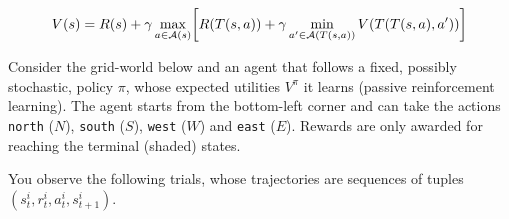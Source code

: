 \documentclass[11pt, a4paper]{exam}
\begin{document}
\begin{exercises}
\begin{parts}
    \begin{solution}
        \begin{equation*}
            V(s) = R(s) + \gamma \max_{a \in \mathcal{A}(s)} \sbk*{ R(T(s, a)) + \gamma \min_{a' \in \mathcal{A}(T(s, a))} V(T(T(s, a), a')) }
        \end{equation*}
    \end{solution}
\end{parts}


Consider the grid-world below and an agent that follows a fixed, possibly stochastic, policy $\pi$, whose expected utilities $V^\pi$ it learns (passive reinforcement learning). The agent starts from the bottom-left corner and can take the actions \texttt{north} ($N$), \texttt{south} ($S$), \texttt{west} ($W$) and \texttt{east} ($E$). Rewards are only awarded for reaching the terminal (shaded) states.

\begin{center}
\end{center}

You observe the following trials, whose trajectories are sequences of tuples $(s^i_t, r^i_t, a^i_t, s^i_{t+1})$.


\end{exercises}
\end{document}
